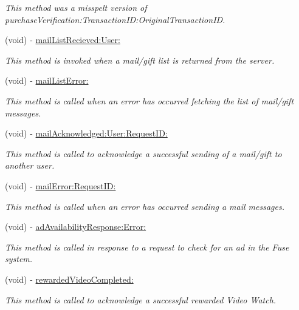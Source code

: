 \begin{DoxyCompactItemize}
\begin{DoxyCompactList}\small\item\em This method was a misspelt version of purchase\+Verification\+:\+Transaction\+I\+D\+:Original\+Transaction\+I\+D. \end{DoxyCompactList}\item 
(void) -\/ \hyperlink{protocol_fuse_delegate-p_ae40c6ea1e99546e883b1ec2e22f3553b}{mail\+List\+Recieved\+:\+User\+:}
\begin{DoxyCompactList}\small\item\em This method is invoked when a mail/gift list is returned from the server. \end{DoxyCompactList}\item 
(void) -\/ \hyperlink{protocol_fuse_delegate-p_ab75e1eb25416cb1407b1608c9bcd7320}{mail\+List\+Error\+:}
\begin{DoxyCompactList}\small\item\em This method is called when an error has occurred fetching the list of mail/gift messages. \end{DoxyCompactList}\item 
(void) -\/ \hyperlink{protocol_fuse_delegate-p_a3c1f1032a86f65de5ed1fab1cba3cf9a}{mail\+Acknowledged\+:\+User\+:\+Request\+I\+D\+:}
\begin{DoxyCompactList}\small\item\em This method is called to acknowledge a successful sending of a mail/gift to another user. \end{DoxyCompactList}\item 
(void) -\/ \hyperlink{protocol_fuse_delegate-p_a6b23517229b099af224dd32b30a925b1}{mail\+Error\+:\+Request\+I\+D\+:}
\begin{DoxyCompactList}\small\item\em This method is called when an error has occurred sending a mail messages. \end{DoxyCompactList}\item 
(void) -\/ \hyperlink{protocol_fuse_delegate-p_ae23c42e3423036d8964225ed735f0a64}{ad\+Availability\+Response\+:\+Error\+:}
\begin{DoxyCompactList}\small\item\em This method is called in response to a request to check for an ad in the Fuse system. \end{DoxyCompactList}\item 
(void) -\/ \hyperlink{protocol_fuse_delegate-p_a7db9bd489c7110189147e953491722ce}{rewarded\+Video\+Completed\+:}
\begin{DoxyCompactList}\small\item\em This method is called to acknowledge a successful rewarded Video Watch. \end{DoxyCompactList}\end{DoxyCompactItemize}


